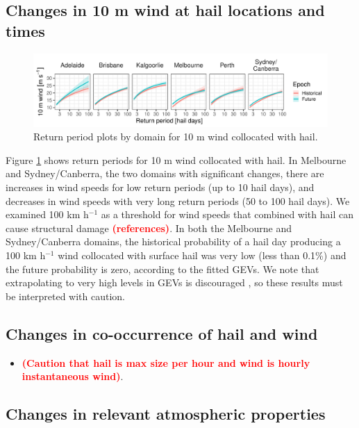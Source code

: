 \documentclass[]{agujournal2019}\usepackage[]{graphicx}\usepackage[]{xcolor}
\newcommand*{\todo}[1]{\textbf{\textcolor{red}{(#1)}}}
\begin{document}
\subsection{Changes in 10 m wind at hail locations and times}

\begin{figure}[!ht]
      \includegraphics[width=\textwidth]{figures/return_periods_wind}
      \caption{Return period plots by domain for 10 m wind collocated with hail.}
      \label{fig:return_periods_wind}
\end{figure}



Figure \ref{fig:return_periods_wind} shows return periods for 10 m wind collocated with hail. In Melbourne and Sydney/Canberra, the two domains with significant changes, there are increases in wind speeds for low return periods (up to 10 hail days), and decreases in wind speeds with very long return periods (50 to 100 hail days). We examined 100 km h$^{-1}$ as a threshold for wind speeds that combined with hail can cause structural damage \todo{references}. In both the Melbourne and Sydney/Canberra domains, the historical probability of a hail day producing a 100 km h$^{-1}$ wind collocated with surface hail was very low (less than 0.1\%) and the future probability is zero, according to the fitted GEVs. We note that extrapolating to very high levels in GEVs is discouraged \cite{Coles_2001}, so these results must be interpreted with caution.

\subsection{Changes in co-occurrence of hail and wind}

\begin{itemize}
\item \todo{Caution that hail is max size per hour and wind is hourly instantaneous wind}.
\end{itemize}

\subsection{Changes in relevant atmospheric properties}
\end{document}
